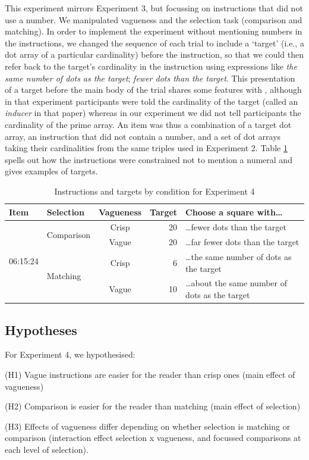 \documentclass[%
man,		%
floatsintext,%
apacite%
]{apa6}
\begin{document}
This experiment mirrors Experiment 3, but focussing on instructions that did not use a number. 
We manipulated vagueness and the selection task (comparison and matching). 
In order to implement the experiment without mentioning numbers in the instructions, we changed the sequence of each trial to include a `target' (i.e., a dot array of a particular cardinality) before the instruction, so that we could then refer back to the target's cardinality in the instruction using expressions like \emph{the same number of dots as the target}; \emph{fewer dots than the target}.
%
This presentation of a target before the main body of the trial shares some features with , although in that experiment participants were told the cardinality of the target (called an \emph{inducer} in that paper) whereas in our experiment we did not tell participants the cardinality of the prime array.
An item was thus a combination of a target dot array, an instruction that did not contain a number, and a set of dot arrays taking their cardinalities from the same triples used in Experiment 2.
Table \ref{Instructions for e4} spells out how the instructions were constrained not to mention a numeral and gives examples of targets.

\begin{table}[htp]
\caption{Instructions and targets by condition for Experiment 4}
\begin{center}
\begin{tabular}{llcrl}
Item					&Selection				&Vagueness	&Target	&Choose a square with\ldots						\\
\toprule
\multirow{4}{*}{06:15:24} 	&\multirow{2}{*}{Comparison} 	&Crisp		&20		&\ldots fewer dots than the target					\\
\cline{3-5}
					&						&Vague		&20		&\ldots far fewer dots than the target					\\
					\cline{2-5}
					&\multirow{2}{*}{Matching}		& Crisp		&6		&\ldots the same number of dots as the target			\\
					\cline{3-5}
					& 		 				&Vague		&10 		&\ldots about the same number of dots as the target		\\
					\bottomrule
\end{tabular}
\end{center}
\label{Instructions for e4}
\end{table}%
	
\subsection{Hypotheses}%
\noindent For Experiment 4, we hypothesised:
{\small
\begin{APAenumerate}
	\item [(H1)] Vague instructions are easier for the reader than crisp ones (main effect of vagueness)
	\item [(H2)] Comparison is easier for the reader than matching (main effect of selection)
	\item [(H3)] Effects of vagueness differ depending on whether selection is matching or comparison (interaction effect selection x vagueness, and focussed comparisons at each level of selection).
\end{APAenumerate}
}
\end{document}
